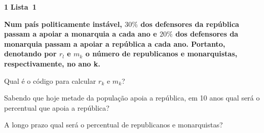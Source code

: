 \documentclass{article}
\newenvironment{question}
    {\medskip\bfseries\large}
    {\medskip}
\newcounter{exe-list}
\newenvironment{exe-list}
    {\begin{list}{(\alph{exe-list})}{\usecounter{exe-list}}}
    {\end{list}}
\newenvironment{exe}[2][Sala]
    {\bigskip\noindent\par\ifthenelse{\equal{#1}{}}%
        {\textbf{\LARGE #2}}%
        {\textbf{\LARGE #1~#2}}%
    \medskip\noindent\par}
    {\bigskip}
\begin{document}
\begin{exe}[Lista]{1}
    \begin{question}
        Num país politicamente instável,
        \(30\%\) dos defensores da república
        passam a apoiar a monarquia a cada ano e
        \(20\%\) dos defensores da monarquia
        passam a apoiar a república a cada ano.
        Portanto, denotando por \(r_l\) e \(m_k\)
        o número de republicanos e monarquistas,
        respectivamente, no ano k.
        \begin{exe-list}
            \item
                Qual é o código para calcular
                \(r_k\) e \(m_k\)?
            \item
                Sabendo que hoje metade da população
                apoia a república,
                em 10 anos
                qual será o percentual que apoia a república?
            \item
                A longo prazo qual será
                o percentual de republicanos e monarquistas?
        \end{exe-list}
    \end{question}
\end{exe}
\end{document}
